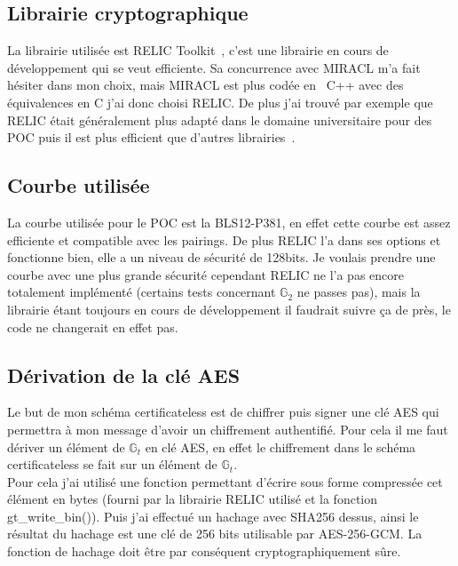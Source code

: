 \subsection{Librairie cryptographique}
La librairie utilisée est RELIC Toolkit~\cite{relic-toolkit}, c'est une librairie en cours de développement qui se veut efficiente. Sa concurrence avec MIRACL m'a fait hésiter dans mon choix, mais MIRACL est plus codée en~ C++ avec des équivalences en C j'ai donc choisi RELIC. De plus j'ai trouvé par exemple que RELIC était généralement plus adapté dans le domaine universitaire pour des POC puis il est plus efficient que d'autres librairies~\cite{performanceRELIC}.
\subsection{Courbe utilisée}
La courbe utilisée pour le POC est la BLS12-P381, en effet cette courbe est assez efficiente et compatible avec les pairings. De plus RELIC l'a dans ses options et fonctionne bien, elle a un niveau de sécurité de 128bits. Je voulais prendre une courbe avec une plus grande sécurité cependant RELIC ne l'a pas encore totalement implémenté (certains tests concernant $\mathbb{G}_2$ ne passes pas), mais la librairie étant toujours en cours de développement il faudrait suivre ça de près, le code ne changerait en effet pas.
\subsection{Dérivation de la clé AES}
Le but de mon schéma certificateless est de chiffrer puis signer une clé AES qui permettra à mon message d'avoir un chiffrement authentifié. Pour cela il me faut dériver un élément de $\mathbb{G}_t$ en clé AES, en effet le chiffrement dans le schéma certificateless se fait sur un élément de $\mathbb{G}_t$.\\
Pour cela j'ai utilisé une fonction permettant d'écrire sous forme compressée cet élément en bytes (fourni par la librairie RELIC utilisé et la fonction gt\_write\_bin()). Puis j'ai effectué un hachage avec SHA256 dessus, ainsi le résultat du hachage est une clé de 256 bits utilisable par AES-256-GCM. La fonction de hachage doit être par conséquent cryptographiquement sûre.
